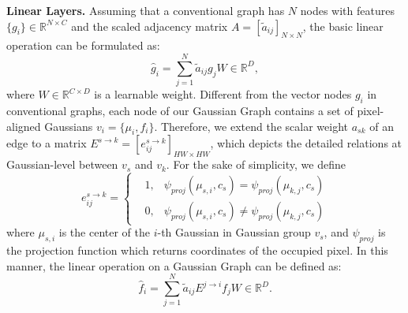 \textbf{Linear Layers.} Assuming that a conventional graph has $N$ nodes with features $\{g_{i}\}\in\mathbb{R}^{N\times C}$ and the scaled adjacency matrix $A=[\tilde{a}_{ij}]_{N\times N}$, the basic linear operation can be formulated as:
\begin{equation}
\hat{g}_{i}=\sum_{j=1}^{N}\tilde{a}_{ij}g_{j}W\in\mathbb{R}^{D},
\end{equation}
where $W\in\mathbb{R}^{C\times D}$ is a learnable weight.
Different from the vector nodes $g_{i}$ in conventional graphs, each node of our Gaussian Graph contains a set of pixel-aligned Gaussians $v_{i}=\{\mu_{i},f_{i}\}$. 
Therefore, we extend the scalar weight $a_{sk}$ of an edge to a matrix $E^{s\rightarrow k}=[e^{s\rightarrow k}_{ij}]_{HW\times HW}$, which depicts the detailed relations at Gaussian-level between $v_{s}$ and $v_{k}$. 
For the sake of simplicity, we define
\begin{equation}
    e^{s\rightarrow k}_{ij} = 
    \left\{
    \begin{aligned}
       & 1, & \psi_{proj}(\mu_{s,i}, c_{s})=\psi_{proj}(\mu_{k,j}, c_{s}) \\
       & 0, & \psi_{proj}(\mu_{s,i}, c_{s})\neq\psi_{proj}(\mu_{k,j}, c_{s})
    \end{aligned}
    \right.
    \label{eq:edge matrix}
\end{equation}
where $\mu_{s,i}$ is the center of the $i$-th Gaussian in Gaussian group $v_{s}$, and $\psi_{proj}$ is the projection function which returns coordinates of the occupied pixel. 
In this manner, the linear operation on a Gaussian Graph can be defined as:
\begin{equation}
    \hat{f}_{i}=\sum_{j=1}^{N}\tilde{a}_{ij}E^{j\rightarrow i}f_{j}W\in\mathbb{R}^{D}.
\end{equation}

